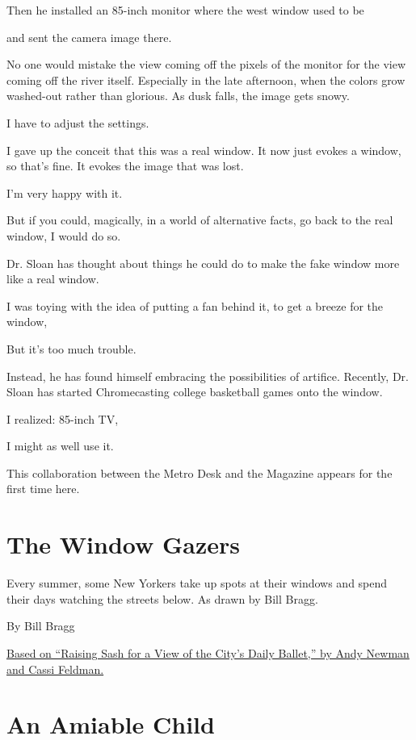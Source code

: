 Then he installed an 85-inch monitor where the west window used to be

and sent the camera image there.

No one would mistake the view coming off the pixels of the monitor for
the view coming off the river itself. Especially in the late afternoon,
when the colors grow washed-out rather than glorious. As dusk falls, the
image gets snowy.

I have to adjust the settings.

I gave up the conceit that this was a real window. It now just evokes a
window, so that's fine. It evokes the image that was lost.

I'm very happy with it.

But if you could, magically, in a world of alternative facts, go back to
the real window, I would do so.

Dr. Sloan has thought about things he could do to make the fake window
more like a real window.

I was toying with the idea of putting a fan behind it, to get a breeze
for the window,

But it's too much trouble.

Instead, he has found himself embracing the possibilities of artifice.
Recently, Dr. Sloan has started Chromecasting college basketball games
onto the window.

I realized: 85-inch TV,

I might as well use it.

This collaboration between the Metro Desk and the Magazine appears for
the first time here.

\hypertarget{the-window-gazers}{%
\section{The Window Gazers}\label{the-window-gazers}}

Every summer, some New Yorkers take up spots at their windows and spend
their days watching the streets below. As drawn by Bill Bragg.

By Bill Bragg

\href{http://www.nytimes3xbfgragh.onion/2007/08/18/nyregion/18summer.html}{Based
on ``Raising Sash for a View of the City's Daily Ballet,'' by Andy
Newman and Cassi Feldman.}

\hypertarget{an-amiable-child}{%
\section{An Amiable Child}\label{an-amiable-child}}

